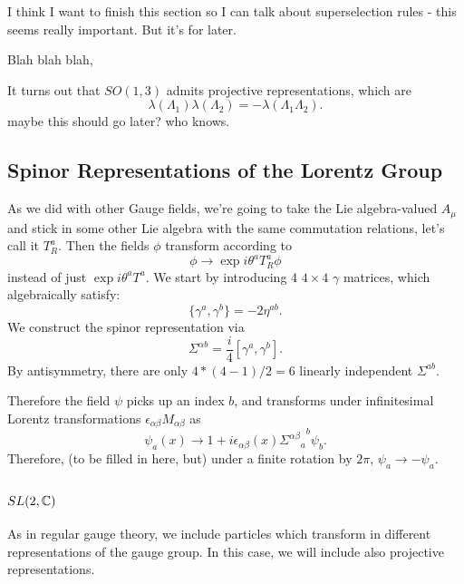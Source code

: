 \documentclass[main.tex]{subfiles}
\begin{document}
I think I want to finish this section so I can talk about superselection rules - this seems really important. But it's for later.

Blah blah blah,

It turns out that $SO(1,3)$ admits projective representations, which are
\[
\lambda(\Lambda_1) \lambda(\Lambda_2) = -\lambda(\Lambda_1 \Lambda_2).
\]
maybe this should go later? who knows.
\newpage
\subsection{Spinor Representations of the Lorentz Group}
As we did with other Gauge fields, we're going to take the Lie algebra-valued $A_\mu$ and stick in some other Lie algebra with the same commutation relations, let's call it $T^a_R$. Then the fields $\phi$ transform according to
\[
\phi \to \exp{i \theta^a T^a_R} \phi
\]
instead of just $\exp{i \theta^a T^a}$.
 We start by introducing 4 $4 \times 4$ $\gamma$ matrices, which algebraically satisfy:
\[
\{\gamma^a,\gamma^b\} = -2\eta^{ab}.
\]
We construct the spinor representation via
\[
\Sigma^{\alpha b} = \frac{i}{4} [\gamma^a, \gamma^b].
\]
By antisymmetry, there are only $4*(4-1)/2 = 6$ linearly independent $\Sigma^{ab}$. 

Therefore the field $\psi$ picks up an index $b$, and transforms under infinitesimal Lorentz transformations $\epsilon_{\alpha \beta} M_{\alpha \beta}$ as 
\[
\psi_a (x) \to 1+ i\epsilon_{\alpha \beta} (x) {{\Sigma^{\alpha \beta}}_a}^b \psi_b.
\]
Therefore, (to be filled in here, but) under a finite rotation by $2\pi$, $\psi_a \to -\psi_a$. 
\newpage
\subsection{$SL(2,\mathbb{C})$}
As in regular gauge theory, we include particles which transform in different representations of the gauge group. In this case, we will include also projective representations.
\end{document}
